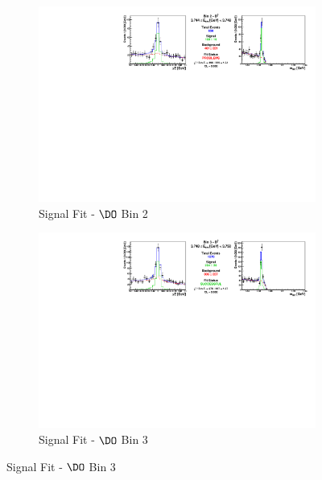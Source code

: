 \begin{figure}[h]

\begin{subfigure}[c]{0.99\textwidth}
\includegraphics[width=\textwidth]{figures/plots/fit_results/D0_bin_02.pdf}
\caption*{Signal Fit - $\DO$ Bin 2}
\end{subfigure}

\vspace{5pt}

\begin{subfigure}[c]{0.99\textwidth}
\includegraphics[width=\textwidth]{figures/plots/fit_results/D0_bin_03.pdf}
\caption*{Signal Fit - $\DO$ Bin 3}
\end{subfigure}

\vspace{5pt}


\end{figure}
